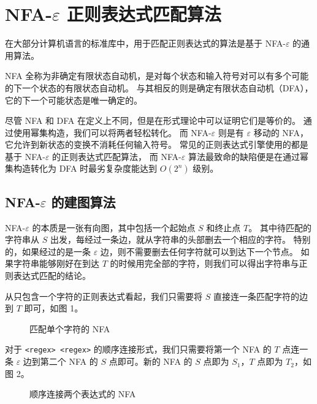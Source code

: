 \documentclass[hyperref,UTF8,12pt,a4paper]{ctexart}
\begin{document}
\section{NFA-$\varepsilon$ 正则表达式匹配算法}

在大部分计算机语言的标准库中，用于匹配正则表达式的算法是基于 NFA-$\varepsilon$ 的通用算法。

NFA 全称为非确定有限状态自动机，是对每个状态和输入符号对可以有多个可能的下一个状态的有限状态自动机。
与其相反的则是确定有限状态自动机（DFA），它的下一个可能状态是唯一确定的。

尽管 NFA 和 DFA 在定义上不同，但是在形式理论中可以证明它们是等价的。
通过使用幂集构造，我们可以将两者轻松转化。
而 NFA-$\varepsilon$ 则是有 $\varepsilon$ 移动的 NFA，它允许到新状态的变换不消耗任何输入符号。
常见的正则表达式引擎使用的都是基于 NFA-$\varepsilon$ 的正则表达式匹配算法，
而 NFA-$\varepsilon$ 算法最致命的缺陷便是在通过幂集构造转化为 DFA 时最劣复杂度能达到 $O(2^n)$ 级别。

\subsection{NFA-$\varepsilon$ 的建图算法}

NFA-$\varepsilon$ 的本质是一张有向图，其中包括一个起始点 $S$ 和终止点 $T$。
其中待匹配的字符串从 $S$ 出发，每经过一条边，就从字符串的头部删去一个相应的字符。
特别的，如果经过的是一条 $\varepsilon$ 边，则不需要删去任何字符就可以到达下一个节点。
如果字符串能够刚好在到达 $T$ 的时候用完全部的字符，则我们可以得出字符串与正则表达式匹配的结论。

从只包含一个字符的正则表达式看起，我们只需要将 $S$ 直接连一条匹配字符的边到 $T$ 即可，如图 1。

\begin{figure}[h]
	\centering
	\caption{匹配单个字符的 NFA}
\end{figure}

对于 \verb!<regex> <regex>! 的顺序连接形式，我们只需要将第一个 NFA 的 $T$ 点连一条 $\varepsilon$ 边到第二个 NFA 的 $S$ 点即可。新的 NFA 的 $S$ 点即为 $S_1$，$T$ 点即为 $T_2$，如图 2。

\begin{figure}[h]
	\centering
	\caption{顺序连接两个表达式的 NFA}
\end{figure}
\end{document}
